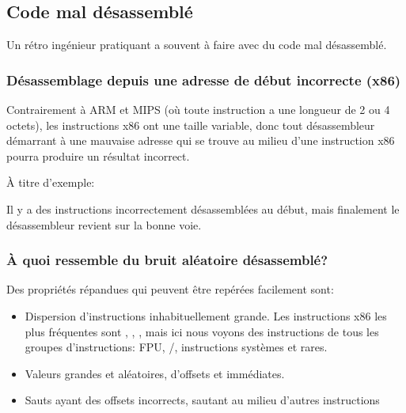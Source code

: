 \subsection{Code mal désassemblé}
\label{sec:incorrectly_disasmed_code}

Un rétro ingénieur pratiquant a souvent à faire avec du code mal désassemblé.

\subsubsection{Désassemblage depuis une adresse de début incorrecte (x86)}

Contrairement à ARM et MIPS (où toute instruction a une longueur de 2 ou 4 octets),
les instructions x86 ont une taille variable, donc tout désassembleur démarrant à
une mauvaise adresse qui se trouve au milieu d'une instruction x86 pourra produire
un résultat incorrect.

À titre d'exemple:



Il y a des instructions incorrectement désassemblées au début, mais finalement le
désassembleur revient sur la bonne voie.

\subsubsection{À quoi ressemble du bruit aléatoire désassemblé?}

Des propriétés répandues qui peuvent être repérées facilement sont:

\begin{itemize}
\item Dispersion d'instructions inhabituellement grande.
Les instructions x86 les plus fréquentes sont \PUSH{}, \MOV{}, \CALL{}, mais ici nous
voyons des instructions de tous les groupes d'instructions: \ac{FPU}, /,
instructions systèmes et rares.

\item Valeurs grandes et aléatoires, d'offsets et immédiates.

\item Sauts ayant des offsets incorrects, sautant au milieu d'autres instructions
\end{itemize}


